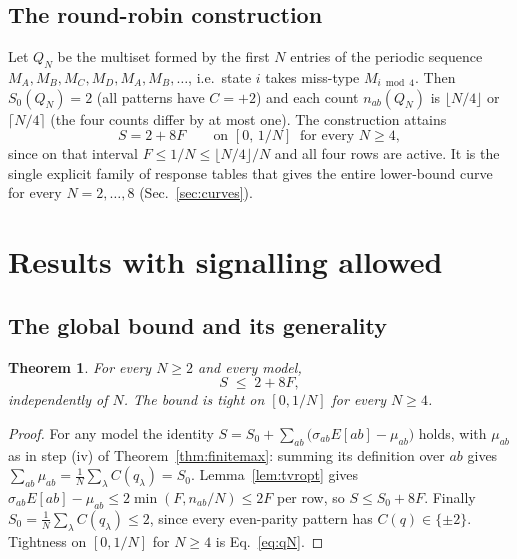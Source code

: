 \documentclass[aps,pra,reprint,superscriptaddress,floatfix]{revtex4-2}
\newtheorem{theorem}{Theorem}
\begin{document}
\subsection{The round-robin construction}
\label{sec:qN}

Let $Q_N$ be the multiset formed by the first $N$ entries of the periodic
sequence $M_A,M_B,M_C,M_D,M_A,M_B,\dots$, i.e.\ state $i$ takes miss-type
$M_{i\bmod 4}$. Then $S_0(Q_N)=2$ (all patterns have $C=+2$) and each count
$n_{ab}(Q_N)$ is $\lfloor N/4\rfloor$ or $\lceil N/4\rceil$ (the four counts
differ by at most one). The construction attains
\begin{equation}
S = 2 + 8F \qquad\text{on } [0,\,1/N]\;\;\text{for every }N\ge 4,
\label{eq:qN}
\end{equation}
since on that interval $F\le 1/N\le \lfloor N/4\rfloor/N$ and all four rows
are active. It is the single explicit family of response tables that gives
the entire lower-bound curve for every $N=2,\dots,8$ (Sec.~\ref{sec:curves}).

\section{Results with signalling allowed}
\label{sec:results}

\subsection{The global bound and its generality}
\label{sec:global}

\begin{theorem}
\label{thm:global}
For every $N\ge2$ and every model,
\begin{equation}
S \;\le\; 2 + 8F ,
\label{eq:global}
\end{equation}
independently of $N$. The bound is tight on $[0,1/N]$ for every $N\ge4$.
\end{theorem}

\begin{proof}
For any model the identity
$S=S_0+\sum_{ab}\bigl(\sigma_{ab}E[ab]-\mu_{ab}\bigr)$ holds, with $\mu_{ab}$
as in step (iv) of Theorem~\ref{thm:finitemax}: summing its definition over
$ab$ gives $\sum_{ab}\mu_{ab}=\frac1N\sum_\lambda C(q_\lambda)=S_0$.
Lemma~\ref{lem:tvropt} gives
$\sigma_{ab}E[ab]-\mu_{ab}\le 2\min(F,n_{ab}/N)\le 2F$ per row, so
$S\le S_0+8F$. Finally $S_0=\frac1N\sum_\lambda C(q_\lambda)\le 2$, since
every even-parity pattern has $C(q)\in\{\pm2\}$. Tightness on $[0,1/N]$ for
$N\ge4$ is Eq.~\eqref{eq:qN}.
\end{proof}
\end{document}
